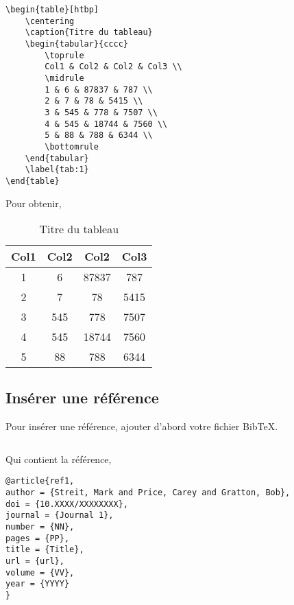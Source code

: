 \begin{verbatim}
\begin{table}[htbp]
    \centering
    \caption{Titre du tableau}
    \begin{tabular}{cccc}
        \toprule
        Col1 & Col2 & Col2 & Col3 \\
        \midrule
        1 & 6 & 87837 & 787 \\
        2 & 7 & 78 & 5415 \\
        3 & 545 & 778 & 7507 \\
        4 & 545 & 18744 & 7560 \\
        5 & 88 & 788 & 6344 \\
        \bottomrule
    \end{tabular}
    \label{tab:1}
\end{table}
\end{verbatim}

Pour obtenir,

\begin{table}[htbp]
    \centering
    \caption{Titre du tableau}
    \begin{tabular}{cccc}
        \toprule
        Col1 & Col2 & Col2 & Col3 \\
        \midrule
        1 & 6 & 87837 & 787 \\
        2 & 7 & 78 & 5415 \\
        3 & 545 & 778 & 7507 \\
        4 & 545 & 18744 & 7560 \\
        5 & 88 & 788 & 6344 \\
        \bottomrule
    \end{tabular}
    \label{tab:1}
\end{table}

\subsection{Insérer une référence}

Pour insérer une référence, ajouter d'abord votre fichier BibTeX.

\begin{verbatim}

\end{verbatim}

Qui contient la référence,

\begin{verbatim}
@article{ref1,
author = {Streit, Mark and Price, Carey and Gratton, Bob},
doi = {10.XXXX/XXXXXXXX},
journal = {Journal 1},
number = {NN},
pages = {PP},
title = {Title},
url = {url},
volume = {VV},
year = {YYYY}
}
\end{verbatim}

